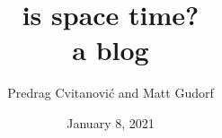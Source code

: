 

\title{ 			is space time?
       \\ \Huge 	a blog
        \\\vspace{1.0cm}
        }\author{
        Predrag Cvitanovi\'{c}
         and
        Matt Gudorf
        }

        \date{January 8, 2021} \Private{\date{\today}}
